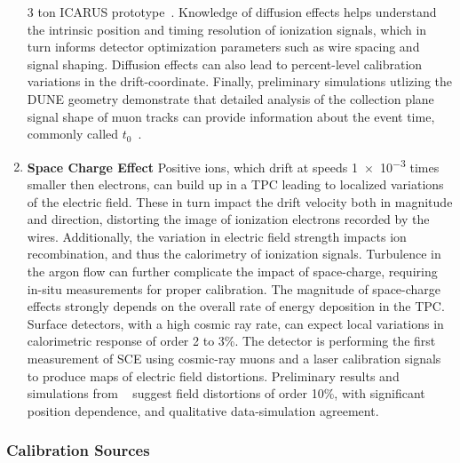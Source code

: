 \begin{enumerate}
\num{3} ton ICARUS prototype~\cite{Li:2015rqa}. Knowledge of diffusion effects helps understand the intrinsic position and timing resolution of ionization signals, which in turn informs detector optimization parameters such as wire spacing and signal shaping. Diffusion effects can also lead to percent-level calibration variations in the drift-coordinate. Finally, preliminary simulations utlizing the DUNE  geometry demonstrate that detailed analysis of the collection plane signal shape of   muon tracks can provide information about the event time, commonly called $t_0$~\cite{Warburton:2017ixr}. 
\item \textbf{Space Charge Effect} Positive ions, which drift at speeds \num{1e-3} %
times smaller then electrons, can build up in a TPC leading to localized variations of the electric field. These in turn impact the drift velocity both in magnitude and direction, distorting the image of ionization electrons recorded by the wires. Additionally, the variation in electric field strength impacts ion recombination, and thus the calorimetry of ionization signals. Turbulence in the argon flow can further complicate the impact of space-charge, requiring in-situ measurements for proper calibration. The magnitude of space-charge effects strongly depends on the overall rate of energy deposition in the TPC. Surface detectors, with a high cosmic ray rate, can expect local variations in calorimetric response of order \num{2} to \num{3}\%. The  detector is performing the first measurement of SCE using cosmic-ray muons and a laser calibration signals to produce maps of electric field distortions. Preliminary results and simulations from ~\cite{MICROBOONE-NOTE-1018-PUB} suggest field distortions of order \num{10}\%, with significant position dependence, and qualitative data-simulation agreement.
\end{enumerate}

\subsubsection{Calibration Sources}

